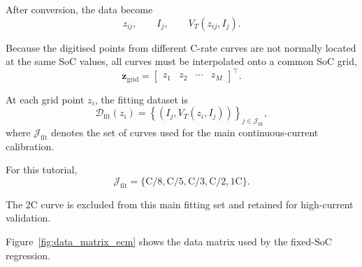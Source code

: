 \documentclass[a4paper,12pt]{article}
\newcommand{\mat}[1]{\mathbf{#1}}
\begin{document}
After conversion, the data become
\[
z_{ij},
\qquad
I_j,
\qquad
V_T(z_{ij},I_j).
\]

Because the digitised points from different C-rate curves are not normally located at the same SoC values, all curves must be interpolated onto a common SoC grid,
\begin{equation}
\mat{z}_{\mathrm{grid}}
=
\begin{bmatrix}
z_1 & z_2 & \cdots & z_M
\end{bmatrix}^{\top}.
\label{eq:data_soc_grid}
\end{equation}

At each grid point \(z_i\), the fitting dataset is
\begin{equation}
\mathcal{D}_{\mathrm{fit}}(z_i)
=
\left\{
\left(I_j,V_T(z_i,I_j)\right)
\right\}_{j\in\mathcal{J}_{\mathrm{fit}}},
\label{eq:data_fixed_soc_dataset}
\end{equation}
where \(\mathcal{J}_{\mathrm{fit}}\) denotes the set of curves used for the main continuous-current calibration.

For this tutorial,
\[
\mathcal{J}_{\mathrm{fit}}
=
\{\mathrm{C/8},\mathrm{C/5},\mathrm{C/3},\mathrm{C/2},\mathrm{1C}\}.
\]

The 2C curve is excluded from this main fitting set and retained for high-current validation.

Figure~\ref{fig:data_matrix_ecm} shows the data matrix used by the fixed-SoC regression.
\end{document}
